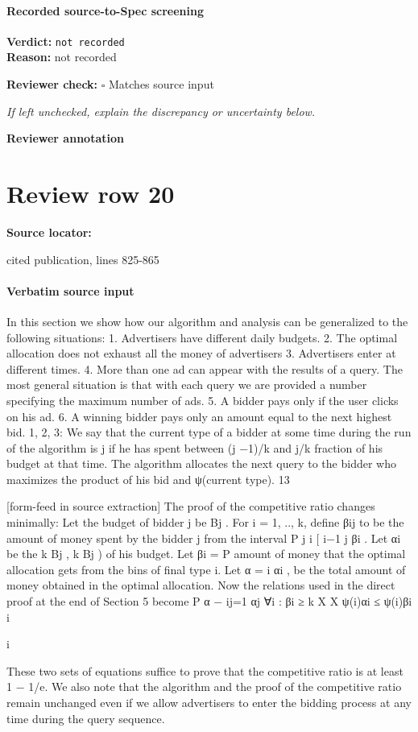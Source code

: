 \documentclass[10pt]{article}
\newcommand{\reviewerbox}{%
  \par\noindent\fbox{\parbox{0.96\linewidth}{\rule{0pt}{0.38in}}}\par
}
\newcommand{\reviewmatch}[1]{%
  \par\noindent\textbf{Reviewer check:} $\square$\; #1\par
  \noindent\emph{If left unchecked, explain the discrepancy or uncertainty below.}\par
}
\begin{document}
\paragraph{Recorded source-to-Spec screening}
\textbf{Verdict:} \texttt{not recorded}
\\
\textbf{Reason:} not recorded
\reviewmatch{Matches source input}
\noindent\textbf{Reviewer annotation}\par
\reviewerbox
\clearpage
\hypertarget{source-claim-e276f37710146cbe}{}
\section*{Review row 20}
\textbf{Source locator:} {\footnotesize\raggedright cited publication, lines 825-\allowbreak{}865\par}
\paragraph{Verbatim source input}
\begin{ReviewVerbatim}
In this section we show how our algorithm and analysis can be generalized to the following
situations:
1. Advertisers have different daily budgets.
2. The optimal allocation does not exhaust all the money of advertisers
3. Advertisers enter at different times.
4. More than one ad can appear with the results of a query. The most general situation is
that with each query we are provided a number specifying the maximum number of ads.
5. A bidder pays only if the user clicks on his ad.
6. A winning bidder pays only an amount equal to the next highest bid.
1, 2, 3: We say that the current type of a bidder at some time during the run of the algorithm
is j if he has spent between (j −1)/k and j/k fraction of his budget at that time. The algorithm
allocates the next query to the bidder who maximizes the product of his bid and ψ(current
type).
13


[form-feed in source extraction]
The proof of the competitive ratio changes minimally: Let the budget of bidder j be Bj . For
i = 1, .., k, define βij to be the amount of money spent by the bidder j from the interval
P j
i
[ i−1
j βi . Let αi be the
k Bj , k Bj ) of his budget. Let βi =
P amount of money that the optimal
allocation gets from the bins of final type i. Let α = i αi , be the total amount of money
obtained in the optimal allocation.
Now the relations used in the direct proof at the end of Section 5 become
P
α − ij=1 αj
∀i : βi ≥
k
X
X
ψ(i)αi ≤
ψ(i)βi
i

i

These two sets of equations suffice to prove that the competitive ratio is at least 1 − 1/e. We
also note that the algorithm and the proof of the competitive ratio remain unchanged even if
we allow advertisers to enter the bidding process at any time during the query sequence.
\end{ReviewVerbatim}
\end{document}
